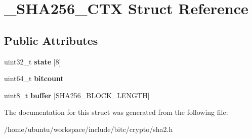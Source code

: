 \hypertarget{struct__SHA256__CTX}{\section{\-\_\-\-S\-H\-A256\-\_\-\-C\-T\-X Struct Reference}
\label{struct__SHA256__CTX}
}
\subsection*{Public Attributes}
\begin{DoxyCompactItemize}
\item 
\hypertarget{struct__SHA256__CTX_abd2d6cafcfc3bac16b0ed3004398441f}{uint32\-\_\-t {\bfseries state} \mbox{[}8\mbox{]}}\label{struct__SHA256__CTX_abd2d6cafcfc3bac16b0ed3004398441f}

\item 
\hypertarget{struct__SHA256__CTX_a8c4fdecd6c096b7d1627720622d39a3d}{uint64\-\_\-t {\bfseries bitcount}}\label{struct__SHA256__CTX_a8c4fdecd6c096b7d1627720622d39a3d}

\item 
\hypertarget{struct__SHA256__CTX_a3961040fe6b7982171684f77a7577572}{uint8\-\_\-t {\bfseries buffer} \mbox{[}S\-H\-A256\-\_\-\-B\-L\-O\-C\-K\-\_\-\-L\-E\-N\-G\-T\-H\mbox{]}}\label{struct__SHA256__CTX_a3961040fe6b7982171684f77a7577572}

\end{DoxyCompactItemize}


The documentation for this struct was generated from the following file\-:\begin{DoxyCompactItemize}
\item 
/home/ubuntu/workspace/include/bitc/crypto/sha2.\-h\end{DoxyCompactItemize}
